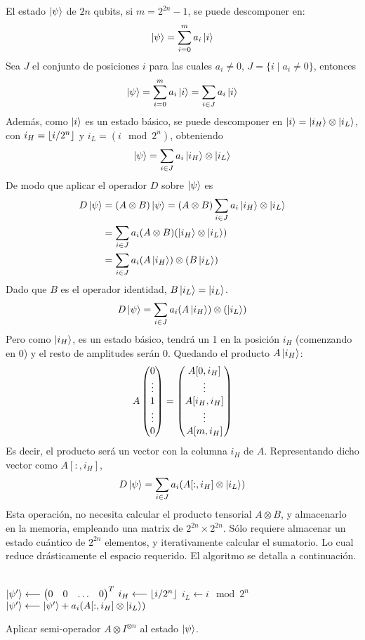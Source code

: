 \begin{ejemplo}
El estado $\ket{\psi}$ de $2n$ qubits, si $m = 2^{2n}-1$, se puede descomponer 
en:
$$ \ket{\psi} = \sum_{i = 0}^{m} a_i \ket{i} $$
Sea $J$ el conjunto de posiciones $i$ para las cuales $a_i \neq 0$, $ J = \{ i 
\mid a_i \neq 0\}$, entonces
$$ \ket{\psi} = \sum_{i = 0}^{m} a_i \ket{i} = \sum_{i \in J} a_i \ket{i} $$
Además, como $\ket{i}$ es un estado básico, se puede descomponer en $\ket{i} = 
\ket{i_H} \otimes \ket{i_L}$, con $i_H=\lfloor i/2^n \rfloor$ y $i_L = (i \mod 2^n)$, 
obteniendo
$$ \ket{\psi} = \sum_{i \in J} a_i \ket{i_H} \otimes \ket{i_L}$$
De modo que aplicar el operador $D$ sobre $\ket{\psi}$ es
\begin{equation}
\begin{split}
D \ket{\psi} &= (A \otimes B) \ket{\psi} = (A \otimes B) \sum_{i \in J} a_i 
\ket{i_H} \otimes \ket{i_L} \\
	&= \sum_{i \in J} a_i (A \otimes B) (\ket{i_H} \otimes \ket{i_L})\\
	&= \sum_{i \in J} a_i (A \ket{i_H}) \otimes (B \ket{i_L})\\
\end{split}
\end{equation}
Dado que $B$ es el operador identidad, $B\ket{i_L} = \ket{i_L}$.
$$ D \ket{\psi} = \sum_{i \in J} a_i (A \ket{i_H}) \otimes (\ket{i_L}) $$
Pero como $\ket{i_H}$, es un estado básico, tendrá un 1 en la posición $i_H$ 
(comenzando en 0) y el resto de amplitudes serán 0. Quedando el producto $A 
\ket{i_H}$:
$$
A \begin{pmatrix} 0 \\ \vdots \\ 1  \\ \vdots\\ 0 \end{pmatrix} =
\begin{pmatrix} A[0,i_H] \\ \vdots \\ A[i_H,i_H] \\ \vdots \\ A[m, i_H] \end{pmatrix}
$$
Es decir, el producto será un vector con la columna $i_H$ de $A$. Representando 
dicho vector como $A[:, i_H]$,
$$
D \ket{\psi} = \sum_{i \in J} a_i (A[:, i_H] \otimes \ket{i_L})
$$
Esta operación, no necesita calcular el producto tensorial $A\otimes B$, y 
almacenarlo en la memoria, empleando una matrix de $2^{2n} \times 2^{2n}$. Sólo 
requiere almacenar un estado cuántico de $2^{2n}$ elementos, y iterativamente 
calcular el sumatorio. Lo cual reduce drásticamente el espacio requerido. El 
algoritmo se detalla a continuación.
\\
\\
\begin{algorithm}[H]
\;
\;
$\ket{\psi'} \longleftarrow \begin{pmatrix} 0 & 0 & \ldots & 0 \end{pmatrix}^T$\;
{
	$i_H \longleftarrow \lfloor i/2^n \rfloor$\;
	$i_L \longleftarrow i \mod 2^n$\;
	$\ket{\psi'} \longleftarrow \ket{\psi'} + a_i (A[:, i_H] \otimes 	
	\ket{i_L}) $\;
}
\caption{Aplicar semi-operador $A\otimes I^{\otimes n}$ al estado $\ket{\psi}$.}
\label{alg:semiop}
\end{algorithm}


\end{ejemplo}

